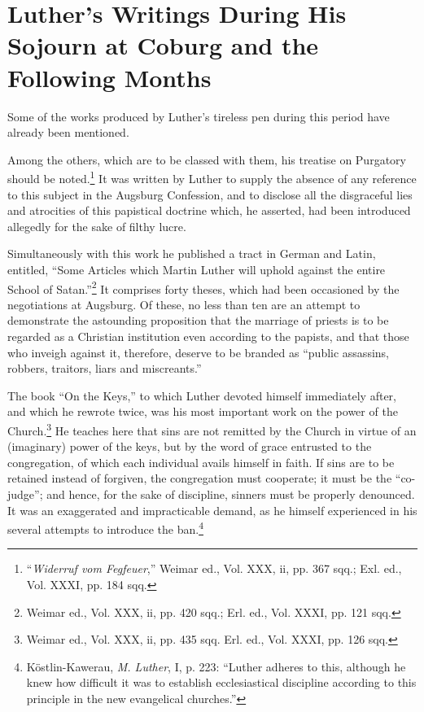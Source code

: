 \section{Luther’s Writings During His Sojourn at Coburg and the Following Months}

Some of the works produced by Luther’s tireless pen during this
period have already been mentioned.

Among the others, which are to be classed with them, his treatise
on Purgatory should be noted.\footnote
{“\textit{Widerruf vom Fegfeuer},” Weimar ed., Vol. XXX, ii, pp. 367 sqq.; Exl. ed., Vol.
XXXI, pp. 184 sqq.}
It was written by Luther to supply
the absence of any reference to this subject in the Augsburg Confession,
and to disclose all the disgraceful lies and atrocities of this papistical
doctrine which, he asserted, had been introduced allegedly for
the sake of filthy lucre.

Simultaneously with this work he published a tract in German and
Latin, entitled, “Some Articles which Martin Luther will uphold
against the entire School of Satan.”\footnote
{Weimar ed., Vol. XXX, ii, pp. 420 sqq.; Erl. ed., Vol. XXXI, pp. 121 sqq.}
It comprises forty theses, which
had been occasioned by the negotiations at Augsburg. Of these, no
less than ten are an attempt to demonstrate the astounding proposition
that the marriage of priests is to be regarded as a Christian institution
even according to the papists, and that those who inveigh
against it, therefore, deserve to be branded as “public assassins, robbers,
traitors, liars and miscreants.”

The book “On the Keys,” to which Luther devoted himself immediately
after, and which he rewrote twice, was his most important
work on the power of the Church.\footnote{Weimar ed., Vol. XXX, ii, pp. 435 sqq. Erl. ed., Vol. XXXI, pp. 126 sqq.}
He teaches here that sins are
not remitted by the Church in virtue of an (imaginary) power of the
keys, but by the word of grace entrusted to the congregation, of
which each individual avails himself in faith. If sins are to be retained
instead of forgiven, the congregation must cooperate; it must be the
“co-judge”; and hence, for the sake of discipline, sinners must be
properly denounced. It was an exaggerated and impracticable demand,
as he himself experienced in his several attempts to introduce
the ban.\footnote
{Köstlin-Kawerau, \textit{M. Luther}, I, p. 223: “Luther adheres to this, although he knew
how difficult it was to establish ecclesiastical discipline according to this principle in the
new evangelical churches.”}

